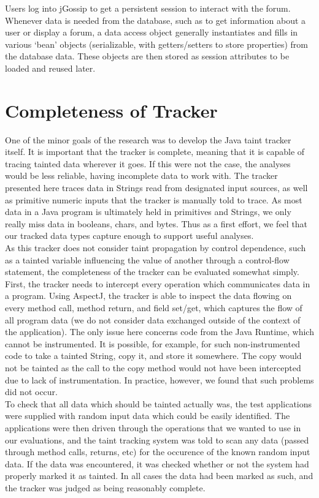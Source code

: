 \documentclass[msc,oneside]{ubcthesis}
\begin{document}
Users log into jGossip to get a persistent session to interact with the forum. Whenever data is needed from the database, such as to get information about a user or display a forum, a data access object generally instantiates and fills in various `bean' objects (serializable, with getters/setters to store properties) from the database data. These objects are then stored as session attributes to be loaded and reused later.

\section{Completeness of Tracker}
One of the minor goals of the research was to develop the Java taint tracker itself. It is important that the tracker is complete, meaning that it is capable of tracing tainted data wherever it goes. If this were not the case, the analyses would be less reliable, having incomplete data to work with. The tracker presented here traces data in Strings read from designated input sources, as well as primitive numeric inputs that the tracker is manually told to trace. As most data in a Java program is ultimately held in primitives and Strings, we only really miss data in booleans, chars, and bytes. Thus as a first effort, we feel that our tracked data types capture enough to support useful analyses. \\

As this tracker does not consider taint propagation by control dependence, such as a tainted variable influencing the value of another through a control-flow statement, the completeness of the tracker can be evaluated somewhat simply.\\

First, the tracker needs to intercept every operation which communicates data in a program. Using AspectJ, the tracker is able to inspect the data flowing on every method call, method return, and field set/get, which captures the flow of all program data (we do not consider data exchanged outside of the context of the application). The only issue here concerns code from the Java Runtime, which cannot be instrumented. It is possible, for example, for such non-instrumented code to take a tainted String, copy it, and store it somewhere. The copy would not be tainted as the call to the copy method would not have been intercepted due to lack of instrumentation. In practice, however, we found that such problems did not occur. \\

To check that all data which should be tainted actually was, the test applications were supplied with random input data which could be easily identified. The applications were then driven through the operations that we wanted to use in our evaluations, and the taint tracking system was told to scan any data (passed through method calls, returns, etc) for the occurence of the known random input data. If the data was encountered, it was checked whether or not the system had properly marked it as tainted. In all cases the data had been marked as such, and the tracker was judged as being reasonably complete.
\end{document}

